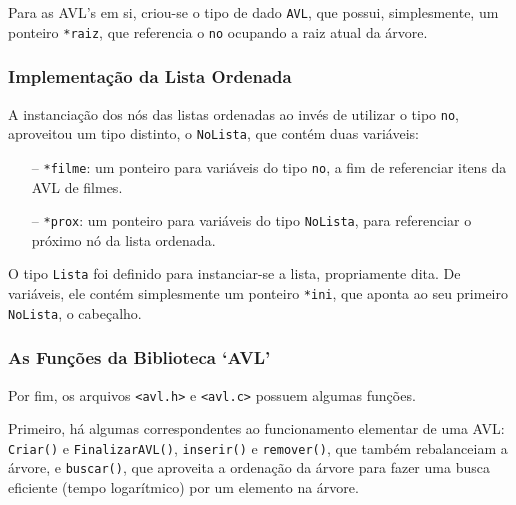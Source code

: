 \documentclass[12pt,a4paper,portuguese]{article}
\begin{document}
        Para as AVL's em si, criou-se o tipo de dado \verb|AVL|, que possui, simplesmente, um ponteiro \verb|*raiz|, que referencia o \verb|no| ocupando a raiz atual da árvore.

    \subsubsection{Implementação da Lista Ordenada}
        A instanciação dos nós das listas ordenadas ao invés de utilizar o tipo \verb|no|, aproveitou um tipo distinto, o \verb|NoLista|, que contém duas variáveis:
        \begin{itemize}
            \item[--]\verb|*filme|: um ponteiro para variáveis do tipo \verb|no|, a fim de referenciar itens da AVL de filmes.
            \item[--]\verb|*prox|: um ponteiro para variáveis do tipo \verb|NoLista|, para referenciar o próximo nó da lista ordenada.
        \end{itemize}
        O tipo \verb|Lista| foi definido para instanciar-se a lista, propriamente dita. De variáveis, ele contém simplesmente um ponteiro \verb|*ini|, que aponta ao seu primeiro \verb|NoLista|, o cabeçalho.

    \subsubsection{As Funções da Biblioteca `AVL'}
        Por fim, os arquivos \verb|<avl.h>| e \verb|<avl.c>| possuem algumas funções.
        
        Primeiro, há algumas correspondentes ao funcionamento elementar de uma AVL: \verb|Criar()| e \verb|FinalizarAVL()|, \verb|inserir()| e \verb|remover()|, que também rebalanceiam a árvore, e \verb|buscar()|, que aproveita a ordenação da árvore para fazer uma busca eficiente (tempo logarítmico) por um elemento na árvore.
\end{document}
